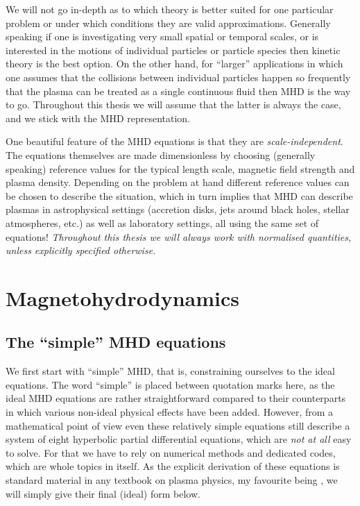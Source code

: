 We will not go in-depth as to which theory is better suited for one particular problem or under which conditions they are valid approximations. Generally speaking if one is investigating very small spatial or temporal scales, or is interested in the motions of individual particles or particle species then kinetic theory is the best option. On the other hand, for ``larger'' applications in which one assumes that the collisions between individual particles happen so frequently that the plasma can be treated as a single continuous fluid then \gls{MHD} is the way to go. Throughout this thesis we will assume that the latter is always the case, and we stick with the \gls{MHD} representation.

One beautiful feature of the \gls{MHD} equations is that they are \emph{scale-independent}. The equations themselves are made dimensionless by choosing (generally speaking) reference values for the typical length scale, magnetic field strength and plasma density. Depending on the problem at hand different reference values can be chosen to describe the situation, which in turn implies that \gls{MHD} can describe plasmas in astrophysical settings (accretion disks, jets around black holes, stellar atmospheres, etc.) as well as laboratory settings, all using the same set of equations!
\emph{Throughout this thesis we will always work with normalised quantities, unless explicitly specified otherwise.}


\section{Magnetohydrodynamics}
\subsection{The ``simple'' MHD equations}
We first start with ``simple'' \gls{MHD}, that is, constraining ourselves to the ideal equations. The word ``simple'' is placed between quotation marks here, as the ideal \gls{MHD} equations are rather straightforward compared to their counterparts in which various non-ideal physical effects have been added. However, from a mathematical point of view even these relatively simple equations still describe a system of eight hyperbolic partial differential equations, which are \emph{not at all} easy to solve. For that we have to rely on numerical methods and dedicated codes, which are whole topics in itself. As the explicit derivation of these equations is standard material in any textbook on plasma physics, my favourite being \citet{book_MHD}, we will simply give their final (ideal) form below.

